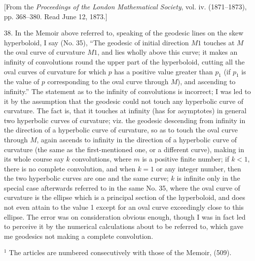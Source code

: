 \documentclass[11pt,a4paper]{article}
\begin{document}
\begin{center}
{\small [From the \emph{Proceedings of the London Mathematical Society}, vol. iv. (1871--1873),
pp. 368--380. Read June 12, 1873.]}
\end{center}

38. In the Memoir above referred to, speaking of the geodesic lines on the skew hyperboloid,
I say (No. 35), ``The geodesic of initial direction $M1$ touches at $M$ the oval curve of
curvature $M1$, and lies wholly above this curve; it makes an infinity of convolutions round
the upper part of the hyperboloid, cutting all the oval curves of curvature for which $p$ has
a positive value greater than $p_1$ (if $p_1$ is the value of $p$ corresponding to the oval
curve through $M$), and ascending to infinity.'' The statement as to the infinity of
convolutions is incorrect; I was led to it by the assumption that the geodesic could not touch
any hyperbolic curve of curvature. The fact is, that it touches at infinity (has for
asymptotes) in general two hyperbolic curves of curvature; viz. the geodesic descending from
infinity in the direction of a hyperbolic curve of curvature, so as to touch the oval curve
through $M$, again ascends to infinity in the direction of a hyperbolic curve of curvature
(the same as the first-mentioned one, or a different curve), making in its whole course say
$k$ convolutions, where $m$ is a positive finite number; if $k<1$, there is no complete
convolution, and when $k=1$ or any integer number, then the two hyperbolic curves are one
and the same curve; $k$ is infinite only in the special case afterwards referred to in the
same No. 35, where the oval curve of curvature is the ellipse which is a principal section
of the hyperboloid, and does not even attain to the value 1 except for an oval curve
exceedingly close to this ellipse. The error was on consideration obvious enough, though
I was in fact led to perceive it by the numerical calculations about to be referred to, which
gave me geodesics not making a complete convolution.

\begin{center}
{\footnotesize $^1$ The articles are numbered consecutively with those of the Memoir, (509).}
\end{center}
\end{document}
